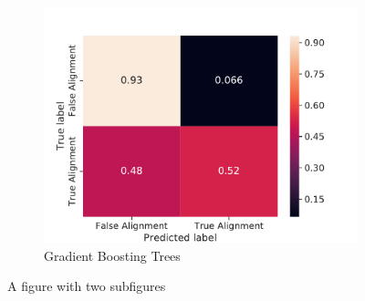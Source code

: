 \documentclass{article}
\begin{document}
\begin{figure}
\begin{subfigure}{.5\textwidth}
  \includegraphics[width=\linewidth]{FinalProject/conf_Gradient_Boosting_Trees.pdf}
\caption{Gradient Boosting Trees}
  \label{fig:sub2}
\end{subfigure}
\caption{A figure with two subfigures}
\label{fig:conf}
\end{figure}
\end{document}
